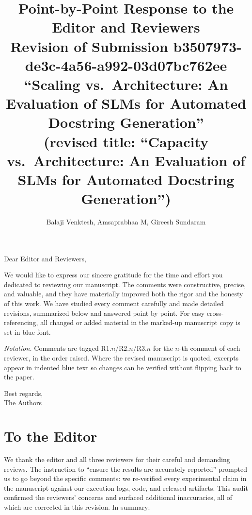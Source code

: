 \documentclass[11pt]{article}
\title{Point-by-Point Response to the Editor and Reviewers\\
\large Revision of Submission b3507973-de3c-4a56-a992-03d07bc762ee\\
``Scaling vs.\ Architecture: An Evaluation of SLMs for Automated Docstring Generation''\\
(revised title: ``Capacity vs.\ Architecture: An Evaluation of SLMs for Automated Docstring Generation'')}
\author{Balaji Venktesh, Amsaprabhaa M, Gireesh Sundaram}
\date{}
\begin{document}
\maketitle

\noindent Dear Editor and Reviewers,

We would like to express our sincere gratitude for the time and effort you dedicated to reviewing our manuscript. The comments were constructive, precise, and valuable, and they have materially improved both the rigor and the honesty of this work. We have studied every comment carefully and made detailed revisions, summarized below and answered point by point. For easy cross-referencing, all changed or added material in the marked-up manuscript copy is set in blue font.

\textit{Notation.} Comments are tagged R1.$n$/R2.$n$/R3.$n$ for the $n$-th comment of each reviewer, in the order raised. Where the revised manuscript is quoted, excerpts appear in indented blue text so changes can be verified without flipping back to the paper.

\medskip
\noindent Best regards,\\
The Authors

\section*{To the Editor}

We thank the editor and all three reviewers for their careful and demanding reviews. The instruction to ``ensure the results are accurately reported'' prompted us to go beyond the specific comments: we re-verified every experimental claim in the manuscript against our execution logs, code, and released artifacts. This audit confirmed the reviewers' concerns and surfaced additional inaccuracies, all of which are corrected in this revision. In summary:
\end{document}
